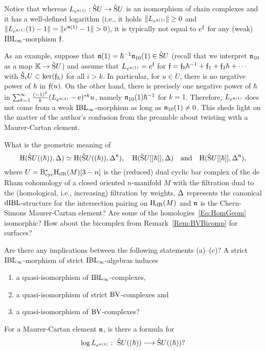 \documentclass[\MainFolder/Text.tex]{subfiles}
\begin{document}
Notice that whereas $L_{e^{\mathfrak{n}(1)}}: \hat{\mathrm{S}}U \rightarrow\hat{\mathrm{S}}U$ is an isomorphism of chain complexes and it has a well-defined logarithm (i.e., it holds $\| L_{e^{\mathfrak{n}(1)}} \|\ge 0$ and $\Norm{L_{e^{\PMC(1)}}(1)-1}=\Norm{e^{\PMC(1)}-1}>0$), it is typically not equal to $e^{\mathfrak{f}}$ for any (weak) $\mathrm{IBL}_\infty$-morphism $\mathfrak{f}$.

As an example, suppose that $\mathfrak{n}(1) = \hbar^{-1}\mathfrak{n}_{10}(1) \in \hat{\mathrm{S}}U$ (recall that we interpret $\mathfrak{n}_{10}$ as a map $\mathbb{K} \rightarrow \hat{\mathrm{S}}U$) and assume that $L_{e^{\mathfrak{n}(1)}} = e^{\mathfrak{f}}$ for $\mathfrak{f} = \mathfrak{f}_0\hbar^{-1} + \mathfrak{f}_1 + \mathfrak{f}_2\hbar + \dotsb$ with $\hat{\mathrm{S}}_i U \subset \ker(\mathfrak{f}_k)$ for all $i>k$. In particular, for $u\in U$, there is no negative power of $\hbar$ in $\mathfrak{f}(u)$. On the other hand, there is precisely one negative power of $\hbar$ in $\sum_{k=1}^\infty \frac{(-1)^k}{k}(L_{e^{\mathfrak{n}(1)}} - \mathrm{e})^{* k}u$, namely $\mathfrak{n}_{10}(1)\hbar^{-1}$ for $k=1$. Therefore, $L_{e^{\mathfrak{n}(1)}}$ does not come from a weak $\mathrm{IBL}_\infty$-morphism as long as $\mathfrak{n}_{10}(1)\neq 0$. This sheds light on the matter of the author's confusion from the preamble about twisting with a Maurer-Cartan element.

\begin{Questions}\label{Q:SomeQuestionsFilter}\begin{RemarkList}
\item What is the geometric meaning of 
\begin{equation}\label{Eq:HomGeom}
\mathrm{H}(\hat{\mathrm{S}}U((\hbar)),\operatorname{\Delta}) \simeq \mathrm{H}(\hat{\mathrm{S}}U((\hbar)),\operatorname{\Delta}^{\mathfrak{n}}), \quad\mathrm{H}(\hat{\mathrm{S}}U[[\hbar]],\operatorname{\Delta})\quad\text{and}\quad\mathrm{H}(\hat{\mathrm{S}}U[[\hbar]],\operatorname{\Delta}^{\mathfrak{n}}),
\end{equation}
where $U=\mathrm{B}_{\mathrm{cyc}}^*\mathrm{H}_{\mathrm{dR}}(M)[3-n]$ is the (reduced) dual cyclic bar complex of the de Rham cohomology of a closed oriented $n$-manifold $M$ with the filtration dual to the (homological, i.e., increasing) filtration by weights, $\operatorname{\Delta}$ represents the canonical $\mathrm{dIBL}$-structure for the intersection pairing on $\mathrm{H}_{\mathrm{dR}}(M)$ and $\mathfrak{n}$ is the Chern-Simons Maurer-Cartan element? Are some of the homologies~\eqref{Eq:HomGeom} isomorphic? How about the bicomplex from Remark~\ref{Rem:BVBicomp} for surfaces?
\item Are there any implications between the following statements (a)--(c)? A strict $\mathrm{IBL}_\infty$-morphism of strict $\mathrm{IBL}_\infty$-algebras induces
\begin{enumerate}[label=(\alph*),leftmargin=1.5cm]
\item a quasi-isomorphism of $\mathrm{IBL}_\infty$-complexes,
\item a quasi-isomorphism of strict $\mathrm{BV}$-complexes and
\item a quasi-isomorphism of $\mathrm{BV}$-complexes? 
\end{enumerate}
\item For a Maurer-Cartan element $\mathfrak{n}$, is there a formula for
\[ \log L_{e^{\mathfrak{n}(1)}}:\ \hat{\mathrm{S}}U((\hbar)) \longrightarrow \hat{\mathrm{S}}U((\hbar))? \]
\qedhere
\end{RemarkList}
\end{Questions}
\end{document}
